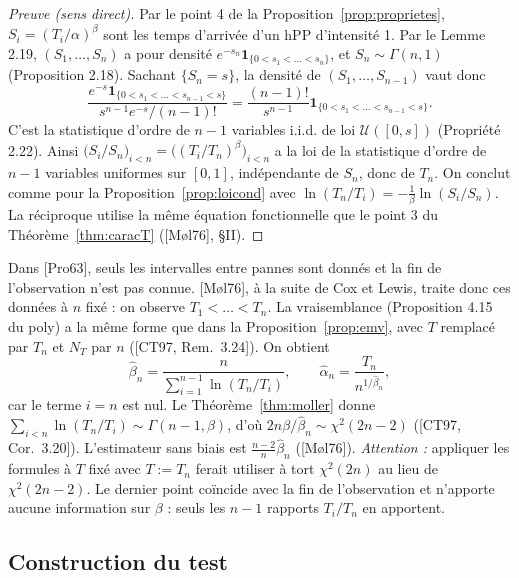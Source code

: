 \begin{proof}[Preuve (sens direct)]
Par le point 4 de la Proposition~\ref{prop:proprietes}, $S_i=(T_i/\alpha)^\beta$ sont les temps d'arrivée d'un hPP d'intensité 1. Par le Lemme 2.19, $(S_1,\dots,S_n)$ a pour densité $e^{-s_n}\mathbf{1}_{\{0<s_1<\dots<s_n\}}$, et $S_n\sim\Gamma(n,1)$ (Proposition 2.18). Sachant $\{S_n=s\}$, la densité de $(S_1,\dots,S_{n-1})$ vaut donc
\[
\frac{e^{-s}\mathbf{1}_{\{0<s_1<\dots<s_{n-1}<s\}}}{s^{n-1}e^{-s}/(n-1)!}=\frac{(n-1)!}{s^{n-1}}\mathbf{1}_{\{0<s_1<\dots<s_{n-1}<s\}}.
\]
C'est la statistique d'ordre de $n-1$ variables i.i.d. de loi $\mathcal{U}([0,s])$ (Propriété 2.22). Ainsi $\big(S_i/S_n\big)_{i<n}=\big((T_i/T_n)^\beta\big)_{i<n}$ a la loi de la statistique d'ordre de $n-1$ variables uniformes sur $[0,1]$, indépendante de $S_n$, donc de $T_n$. On conclut comme pour la Proposition~\ref{prop:loicond} avec $\ln(T_n/T_i)=-\frac1\beta\ln(S_i/S_n)$. La réciproque utilise la même équation fonctionnelle que le point 3 du Théorème~\ref{thm:caracT} ([Møl76], §II).
\end{proof}

\begin{remarque}\label{rem:nfixe}
Dans [Pro63], seuls les intervalles entre pannes sont donnés et la fin de l'observation n'est pas connue. [Møl76], à la suite de Cox et Lewis, traite donc ces données à $n$ fixé : on observe $T_1<\dots<T_n$. La vraisemblance (Proposition 4.15 du poly) a la même forme que dans la Proposition~\ref{prop:emv}, avec $T$ remplacé par $T_n$ et $N_T$ par $n$ ([CT97, Rem.~3.24]). On obtient
\[
\hat\beta_n=\frac{n}{\sum_{i=1}^{n-1}\ln(T_n/T_i)},\qquad\hat\alpha_n=\frac{T_n}{n^{1/\hat\beta_n}},
\]
car le terme $i=n$ est nul. Le Théorème~\ref{thm:moller} donne $\sum_{i<n}\ln(T_n/T_i)\sim\Gamma(n-1,\beta)$, d'où $2n\beta/\hat\beta_n\sim\chi^2(2n-2)$ ([CT97, Cor.~3.20]). L'estimateur sans biais est $\frac{n-2}{n}\hat\beta_n$ ([Møl76]). \emph{Attention :} appliquer les formules à $T$ fixé avec $T:=T_n$ ferait utiliser à tort $\chi^2(2n)$ au lieu de $\chi^2(2n-2)$. Le dernier point coïncide avec la fin de l'observation et n'apporte aucune information sur $\beta$ : seuls les $n-1$ rapports $T_i/T_n$ en apportent.
\end{remarque}

\subsection{Construction du test}\label{sec:test}

